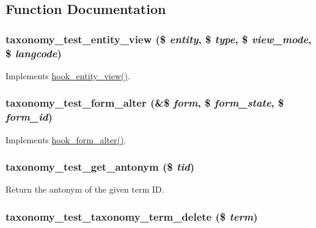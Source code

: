 \subsection{Function Documentation}
\hypertarget{taxonomy__test_8module_adbb49d1cf16cc8fef17dfdb6669e5e49}{
\subsubsection[{taxonomy\_\-test\_\-entity\_\-view}]{\setlength{\rightskip}{0pt plus 5cm}taxonomy\_\-test\_\-entity\_\-view (\$ {\em entity}, \/  \$ {\em type}, \/  \$ {\em view\_\-mode}, \/  \$ {\em langcode})}}
\label{taxonomy__test_8module_adbb49d1cf16cc8fef17dfdb6669e5e49}
Implements \hyperlink{group__hooks_gae273ba271c2ef1192fe135afa9da5d49}{hook\_\-entity\_\-view()}. \hypertarget{taxonomy__test_8module_a7e2138428bddc8b571fccfba5208486b}{
\subsubsection[{taxonomy\_\-test\_\-form\_\-alter}]{\setlength{\rightskip}{0pt plus 5cm}taxonomy\_\-test\_\-form\_\-alter (\&\$ {\em form}, \/  \$ {\em form\_\-state}, \/  \$ {\em form\_\-id})}}
\label{taxonomy__test_8module_a7e2138428bddc8b571fccfba5208486b}
Implements \hyperlink{group__hooks_ga6df3cea27ae1407aeef4eae5444cb213}{hook\_\-form\_\-alter()}. \hypertarget{taxonomy__test_8module_a19c6f9c9e801ed9373e8190a678cc2bd}{
\subsubsection[{taxonomy\_\-test\_\-get\_\-antonym}]{\setlength{\rightskip}{0pt plus 5cm}taxonomy\_\-test\_\-get\_\-antonym (\$ {\em tid})}}
\label{taxonomy__test_8module_a19c6f9c9e801ed9373e8190a678cc2bd}
Return the antonym of the given term ID. \hypertarget{taxonomy__test_8module_a9d8897ea32360be0eea901c95ac73ebc}{
\subsubsection[{taxonomy\_\-test\_\-taxonomy\_\-term\_\-delete}]{\setlength{\rightskip}{0pt plus 5cm}taxonomy\_\-test\_\-taxonomy\_\-term\_\-delete (\$ {\em term})}}
